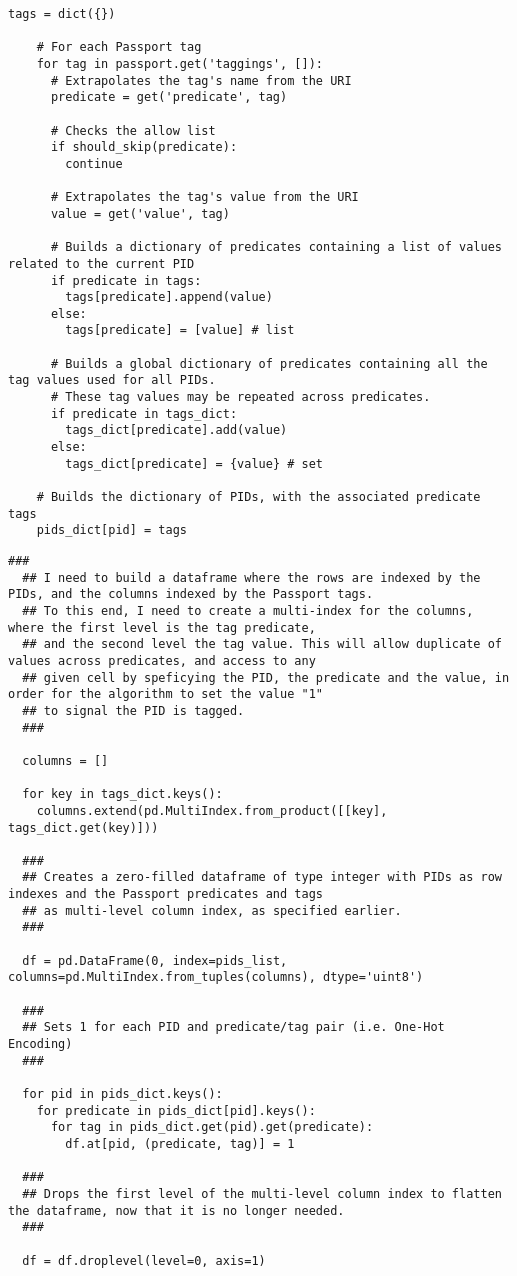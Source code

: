 \begin{lstlisting}[caption={Passport tags loading},label={lst:data_loading}]
    tags = dict({})

    # For each Passport tag
    for tag in passport.get('taggings', []):
      # Extrapolates the tag's name from the URI
      predicate = get('predicate', tag)

      # Checks the allow list
      if should_skip(predicate):
        continue

      # Extrapolates the tag's value from the URI
      value = get('value', tag)

      # Builds a dictionary of predicates containing a list of values related to the current PID
      if predicate in tags:
        tags[predicate].append(value)
      else:
        tags[predicate] = [value] # list

      # Builds a global dictionary of predicates containing all the tag values used for all PIDs.
      # These tag values may be repeated across predicates.
      if predicate in tags_dict:
        tags_dict[predicate].add(value)
      else:
        tags_dict[predicate] = {value} # set

    # Builds the dictionary of PIDs, with the associated predicate tags
    pids_dict[pid] = tags
\end{lstlisting}

\begin{lstlisting}[caption={One-hot encoding of the data in a Pandas DataFrame},label={lst:data_encoding}]
  ###
  ## I need to build a dataframe where the rows are indexed by the PIDs, and the columns indexed by the Passport tags.
  ## To this end, I need to create a multi-index for the columns, where the first level is the tag predicate,
  ## and the second level the tag value. This will allow duplicate of values across predicates, and access to any
  ## given cell by speficying the PID, the predicate and the value, in order for the algorithm to set the value "1"
  ## to signal the PID is tagged.
  ###

  columns = []

  for key in tags_dict.keys():
    columns.extend(pd.MultiIndex.from_product([[key], tags_dict.get(key)]))

  ###
  ## Creates a zero-filled dataframe of type integer with PIDs as row indexes and the Passport predicates and tags
  ## as multi-level column index, as specified earlier.
  ###

  df = pd.DataFrame(0, index=pids_list, columns=pd.MultiIndex.from_tuples(columns), dtype='uint8')

  ###
  ## Sets 1 for each PID and predicate/tag pair (i.e. One-Hot Encoding)
  ###

  for pid in pids_dict.keys():
    for predicate in pids_dict[pid].keys():
      for tag in pids_dict.get(pid).get(predicate):
        df.at[pid, (predicate, tag)] = 1

  ###
  ## Drops the first level of the multi-level column index to flatten the dataframe, now that it is no longer needed.
  ###

  df = df.droplevel(level=0, axis=1)
\end{lstlisting}

